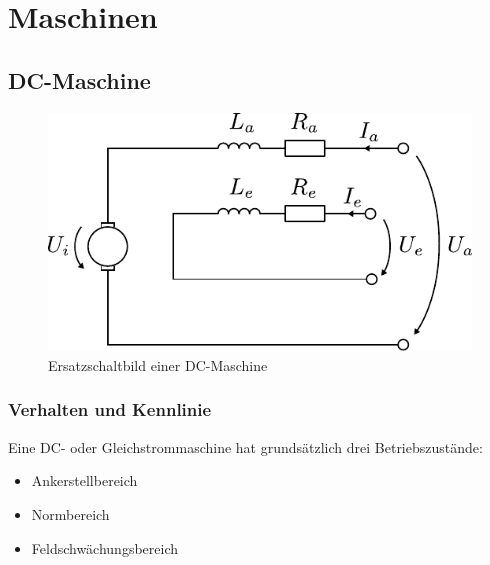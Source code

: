 \chapter{Maschinen}

\newpage

\section{DC-Maschine}

\begin{figure}[h!]
\centering
\includegraphics[scale=\schscale]{../fig/dc-motor.pdf}
\caption{Ersatzschaltbild einer DC-Maschine}
\label{sch:dc-maschine}
\end{figure}

\subsection{Verhalten und Kennlinie}

Eine DC- oder Gleichstrommaschine hat grundsätzlich drei Betriebszustände:
\begin{itemize}
	\item Ankerstellbereich
	\item Normbereich
	\item Feldschwächungsbereich
\end{itemize}

